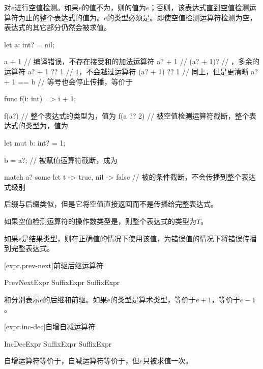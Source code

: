 \pnum
{}对$e$进行空值检测。如果$e$的值不为，则的值为$e$；否则，该表达式直到空值检测运算符为止的整个表达式的值为。$e$的类型必须是。即使空值检测运算符检测为空，表达式的其它部分仍然会被求值。

\enterexample
\begin{codeblock}
let a: int? = nil;

a + 1 // 编译错误，不存在接受和的加法运算符
a? + 1 // 
(a? + 1)? // ，多余的运算符
a? + 1 ?? 1 // $1$，不会越过运算符
(a? + 1) ?? 1 // 同上，但是更清晰
a? + 1 == b // 等号也会停止传播，等价于

func f(i: int) => i + 1;

f(a?) // 整个表达式的类型为，值为
f(a ?? 2) // 被空值检测运算符截断，整个表达式的类型为，值为

let mut b: int? = 1;

b = a?; // 被赋值运算符截断，成为

match a? { some let t -> true, nil -> false } // 被的条件截断，不会传播到整个表达式级别
\end{codeblock}
\exitexample

\pnum
后缀\tcode{!}与后缀类似，但是它将空值直接返回而不是传播给完整表达式。

\pnum
如果空值检测运算符的操作数类型是，则整个表达式的类型为$T$。

\pnum
如果$e$是结果类型，则在正确值的情况下使用该值，为错误值的情况下将错误传播到完整表达式。

[expr.prev-next]{前驱后继运算符}

\begin{bnf}{PrevNextExpr}
    SuffixExpr \terminal{+!} \br
    SuffixExpr \terminal{-!}
\end{bnf}

\pnum
{}和分别表示$e$的后继和前驱。如果$e$的类型是算术类型，等价于$e+1$，等价于$e-1$。

[expr.inc-dec]{自增自减运算符}

\begin{bnf}{IncDecExpr}
    SuffixExpr \terminal{++} \br
    SuffixExpr \terminal{--}
\end{bnf}

\pnum
自增运算符等价于，自减运算符等价于，但$e$只被求值一次。

